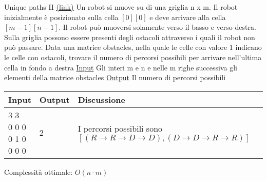 \begin{esercizio}{Unique paths II \href{https://leetcode.com/problems/unique-paths/description/}{(link)} }
	Un robot si muove su di una griglia {\ttfamily n x m}. Il robot inizialmente è posizionato sulla cella $ \left[0\right]\left[0\right] $ e deve arrivare alla cella $ \left[m-1\right]\left[n-1\right] $. Il robot può muoversi solamente verso il basso e verso destra. Sulla griglia possono essere presenti degli ostacoli attraverso i quali il robot non può passare. Data una matrice {\ttfamily obstacles}, nella quale le celle con valore 1 indicano le celle con ostacoli, trovare il numero di percorsi possibili per arrivare nell'ultima cella in fondo a destra
	\vskip3mm
	\vskip3mm
	\underline{Input}
	\vskip3mm
	Gli interi {\ttfamily m} e {\ttfamily n} e nelle {\ttfamily m} righe successiva gli elementi della matrice {\ttfamily obstacles}
	\vskip3mm
	\underline{Output}
	\vskip3mm
	Il numero di percorsi possibili
	\renewcommand{\cellalign}{l}
	\begin{center}
		\begin{tabularx}{\textwidth}{llX}
			\toprule
			Input & Output & Discussione                                                                     \\
			\midrule
			\makecell{3 3                                                                                    \\ 0 0 0 \\ 0 1 0 \\ 0 0 0}& 2  & I percorsi possibili sono \vskip0mm
			$[(R \rightarrow R \rightarrow D \rightarrow D), (D \rightarrow D \rightarrow R \rightarrow R)]$ \\
			\bottomrule
		\end{tabularx}
	\end{center}
	Complessità ottimale: $ O\left(n \cdot  m\right) $
\end{esercizio}

